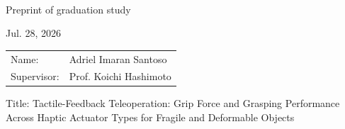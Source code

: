 \documentclass[a4paper, 12pt]{article}
\newcommand\textline[4][t]{%
  \par\smallskip\noindent\parbox[#1]{.333\textwidth}{\raggedright #2}%
  \parbox[#1]{.333\textwidth}{\centering #3}%
  \parbox[#1]{.333\textwidth}{\raggedleft #4}\par\smallskip%
}
\begin{document}
\textline[t]{\,\,}{Preprint of graduation study}{Jul. 28, 2026}
\vspace{0.1\baselineskip}
\begin{flushright}
  \begin{tabular}{@{}ll@{}}
    Name:       & Adriel Imaran Santoso  \\
    Supervisor: & Prof. Koichi Hashimoto \\
  \end{tabular}
\end{flushright}
\begin{center}
  Title: Tactile-Feedback Teleoperation: Grip Force and Grasping Performance \\
  Across Haptic Actuator Types for Fragile and Deformable Objects
\end{center}
\vspace{0.2\baselineskip}
\end{document}
